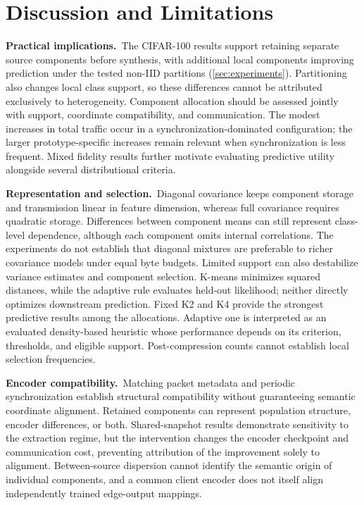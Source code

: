\section{Discussion and Limitations}
\label{sec:discussion}

\noindent\textbf{Practical implications.}~The CIFAR-100 results support retaining separate source components before synthesis, with additional local components improving prediction under the tested non-IID partitions (\cref{sec:experiments}). Partitioning also changes local class support, so these differences cannot be attributed exclusively to heterogeneity. Component allocation should be assessed jointly with support, coordinate compatibility, and communication. The modest increases in total traffic occur in a synchronization-dominated configuration; the larger prototype-specific increases remain relevant when synchronization is less frequent. Mixed fidelity results further motivate evaluating predictive utility alongside several distributional criteria.

\noindent\textbf{Representation and selection.}~Diagonal covariance keeps component storage and transmission linear in feature dimension, whereas full covariance requires quadratic storage. Differences between component means can still represent class-level dependence, although each component omits internal correlations. The experiments do not establish that diagonal mixtures are preferable to richer covariance models under equal byte budgets. Limited support can also destabilize variance estimates and component selection. K-means minimizes squared distances, while the adaptive rule evaluates held-out likelihood; neither directly optimizes downstream prediction. Fixed K2 and K4 provide the strongest predictive results among the allocations. Adaptive one is interpreted as an evaluated density-based heuristic whose performance depends on its criterion, thresholds, and eligible support. Post-compression counts cannot establish local selection frequencies.

\noindent\textbf{Encoder compatibility.}~Matching packet metadata and periodic synchronization establish structural compatibility without guaranteeing semantic coordinate alignment. Retained components can represent population structure, encoder differences, or both. Shared-snapshot results demonstrate sensitivity to the extraction regime, but the intervention changes the encoder checkpoint and communication cost, preventing attribution of the improvement solely to alignment. Between-source dispersion cannot identify the semantic origin of individual components, and a common client encoder does not itself align independently trained edge-output mappings.

